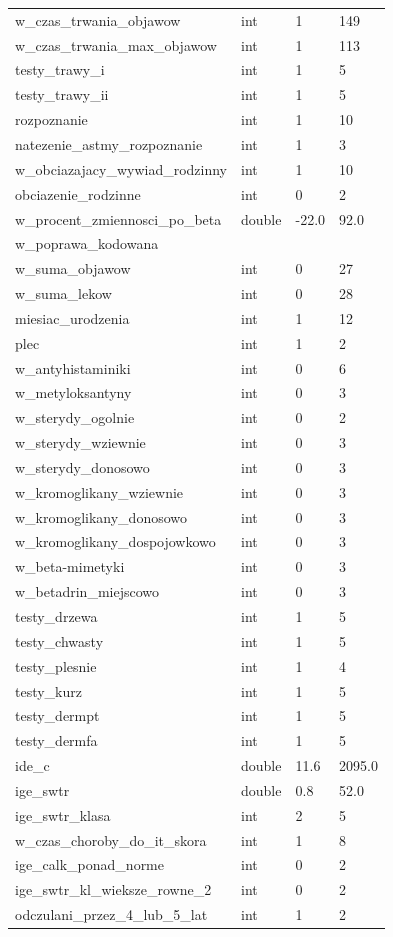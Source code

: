 \documentclass[10pt,oneside]{memoir}
\begin{document}
\begin{table}[htbp]
\begin{minipage}{\linewidth}
\begin{tabulary}{\linewidth}{@{}l@{}l@{}l@{}l@{}}
w\_czas\_trwania\_objawow&int&1&149 \\
w\_czas\_trwania\_max\_objawow&int&1&113 \\
testy\_trawy\_i&int&1&5 \\
testy\_trawy\_ii&int&1&5 \\
rozpoznanie&int&1&10 \\
natezenie\_astmy\_rozpoznanie&int&1&3 \\
w\_obciazajacy\_wywiad\_rodzinny&int&1&10 \\
obciazenie\_rodzinne&int&0&2 \\
w\_procent\_zmiennosci\_po\_beta&double&-22.0&92.0 \\
w\_poprawa\_kodowana&&& \\
w\_suma\_objawow&int&0&27 \\
w\_suma\_lekow&int&0&28 \\
miesiac\_urodzenia&int&1&12 \\
plec&int&1&2 \\
w\_antyhistaminiki&int&0&6 \\
w\_metyloksantyny&int&0&3 \\
w\_sterydy\_ogolnie&int&0&2 \\
w\_sterydy\_wziewnie&int&0&3 \\
w\_sterydy\_donosowo&int&0&3 \\
w\_kromoglikany\_wziewnie&int&0&3 \\
w\_kromoglikany\_donosowo&int&0&3 \\
w\_kromoglikany\_dospojowkowo&int&0&3 \\
w\_beta-mimetyki&int&0&3 \\
w\_betadrin\_miejscowo&int&0&3 \\
testy\_drzewa&int&1&5 \\
testy\_chwasty&int&1&5 \\
testy\_plesnie&int&1&4 \\
testy\_kurz&int&1&5 \\
testy\_dermpt&int&1&5 \\
testy\_dermfa&int&1&5 \\
ide\_c&double&11.6&2095.0 \\
ige\_swtr&double&0.8&52.0 \\
ige\_swtr\_klasa&int&2&5 \\
w\_czas\_choroby\_do\_it\_skora&int&1&8 \\
ige\_calk\_ponad\_norme&int&0&2 \\
ige\_swtr\_kl\_wieksze\_rowne\_2&int&0&2 \\
odczulani\_przez\_4\_lub\_5\_lat&int&1&2 \\

\end{tabulary}
\end{minipage}
\end{table}
\end{document}
